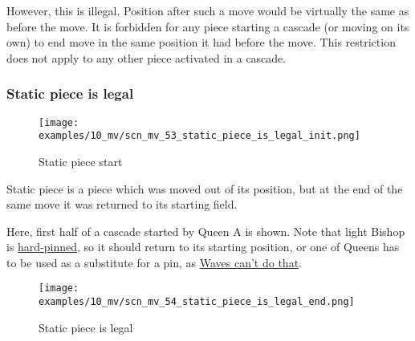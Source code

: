 However, this is illegal. Position after such a move would be virtually the same
as before the move. It is forbidden for any piece starting a cascade (or moving
on its own) to end move in the same position it had before the move. This
restriction does not apply to any other piece activated in a cascade.

\clearpage %

\subsubsection*{Static piece is legal}
\label{sec:Miranda's veil/Wave/Cascading Waves/Static piece is legal}

\vspace*{-1.4\baselineskip}
\noindent
\begin{figure}[!h]
\texttt{[image: examples/10\_mv/scn\_mv\_53\_static\_piece\_is\_legal\_init.png]}
\vspace*{-1.3\baselineskip}
\caption{Static piece start}
\label{fig:scn_mv_53_static_piece_is_legal_init}
\end{figure}

\vspace*{-0.4\baselineskip}
Static piece is a piece which was moved out of its position, but at the end of the
same move it was returned to its starting field.

Here, first half of a cascade started by Queen A is shown. Note that light Bishop
is \href{https://en.wikipedia.org/wiki/Pin_(chess)#Absolute_pin}{hard-pinned}, so
it should return to its starting position, or one of Queens has to be used as a
substitute for a pin, as
\hyperref[fig:scn_mv_43_pinned_piece_cascaded_init]{Waves can't do that}.

\clearpage %

\vspace*{-2.1\baselineskip}
\noindent
\begin{figure}[!h]
\texttt{[image: examples/10\_mv/scn\_mv\_54\_static\_piece\_is\_legal\_end.png]}
\vspace*{-1.3\baselineskip}
\caption{Static piece is legal}
\label{fig:scn_mv_54_static_piece_is_legal_end}
\end{figure}

